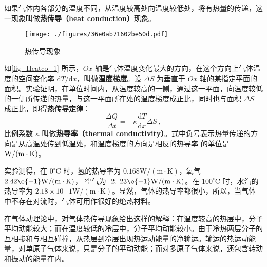 
如果气体内各部分的温度不同，从温度较高处向温度较低处，将有热量的传递，这一现象叫做\textbf{热传导（heat conduction）}现象。

\begin{figure}[ht]
\centering
\texttt{[image: ./figures/36e0ab71602be50d.pdf]}
\caption{热传导现象} \label{fig_Heatco_1}
\end{figure}

如\autoref{fig_Heatco_1} 所示，$Ox$ 轴是气体温度变化最大的方向，在这个方向上气体温度的空间变化率 $\mathrm dT/\mathrm dx$，叫做\textbf{温度梯度}。设 $\Delta S$ 为垂直于 $Ox $ 轴的某指定平面的面积。实验证明，在单位时间内，从温度较高的一侧，通过这一平面，向温度较低的一侧所传递的热量，与这一平面所在处的温度梯度成正比，同时也与面积 $\Delta S$ 成正比，即得\textbf{热传导定律}：
\begin{equation}
\frac{\Delta Q}{\Delta t}=-\kappa \frac{\mathrm{d} T}{\mathrm{d} x} \Delta S~,
\end{equation}
比例系数 $\kappa$ 叫做\textbf{热导率（thermal conductivity）}。式中负号表示热量传递的方向是从高温处传到低温处，和温度梯度的方向是相反的热导率
的单位是 $\rm W /(m \cdot K)$。

实验测得，在 $0^{\circ} \mathrm{C}$ 时，氢的热导率为 $0.168 \mathrm{W} /(\mathrm{m} \cdot \mathrm{K})$，氧气 $2.42\e{-1} \mathrm{W} /(\mathrm{m} \cdot \mathrm{K})$， 空气为 $\text { 2. } 23\e{-1} \mathrm{W} /(\mathrm{m} \cdot \mathrm{K})$。在 $100^{\circ} \mathrm{C}$ 时，水汽的热导率为 $2. 18\times  10{-1}\mathrm{W} /(\mathrm{m} \cdot \mathrm{K})$。显然，气体的热导率都很小，所以，当气体中不存在对流时，气体可用作很好的绝热材料。

在气体动理论中，对气体热传导现象给出这样的解释：在温度较高的热层中，分子平均动能较大；而在温度较低的冷层中，分子平均动能较小。由于冷热两层分子的互相掺和与相互碰撞，从热层到冷层出现热运动能量的净输运。输运的热运动能量，对单原子气体来说，只是分子的平动动能；而对多原子气体来说，还包含转动和振动的能量在内。